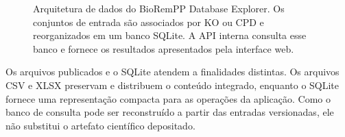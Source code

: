 \begin{figure}[htbp]
\centering
{}
\caption{Arquitetura de dados do BioRemPP Database Explorer. Os conjuntos de
entrada são associados por KO ou CPD e reorganizados em um banco SQLite. A
API interna consulta esse banco e fornece os resultados apresentados pela
interface web. } 
\label{fig:c2-data-architecture}
\end{figure}


Os arquivos publicados e o SQLite atendem a finalidades distintas. Os
arquivos CSV e XLSX preservam e distribuem o conteúdo integrado, enquanto o
SQLite fornece uma representação compacta para as operações da aplicação.
Como o banco de consulta pode ser reconstruído a partir das entradas
versionadas, ele não substitui o artefato científico depositado.

